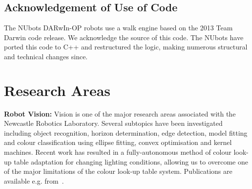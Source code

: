 \documentclass{llncs}
\begin{document}



\subsection{Acknowledgement of Use of Code}
The NUbots DARwIn-OP robots use a walk engine based on the 2013 Team Darwin code release. We acknowledge the source of this code. The NUbots have ported this code to C++ and restructured the logic, making numerous structural and technical changes since. %

\section{Research Areas}

\noindent\textbf{Robot Vision:} Vision is one of the major research areas associated with the Newcastle Robotics Laboratory. Several subtopics have been investigated including object recognition, horizon determination, edge detection, model fitting and colour classification using ellipse fitting, convex optimisation and kernel machines. Recent work has resulted in a fully-autonomous method of colour look-up table adaptation for changing lighting conditions, allowing us to overcome one of the major limitations of the colour look-up table system. Publications are available e.g. from~\cite{budden2012colour,budden2012ball,henderson_2007,nicklin_2007,NUBOT2006,Henderson2008,flannery2013ransac,budden2013salient,HoulistonEtAl2015,MetcalfeEtAl2016}.
\end{document}
